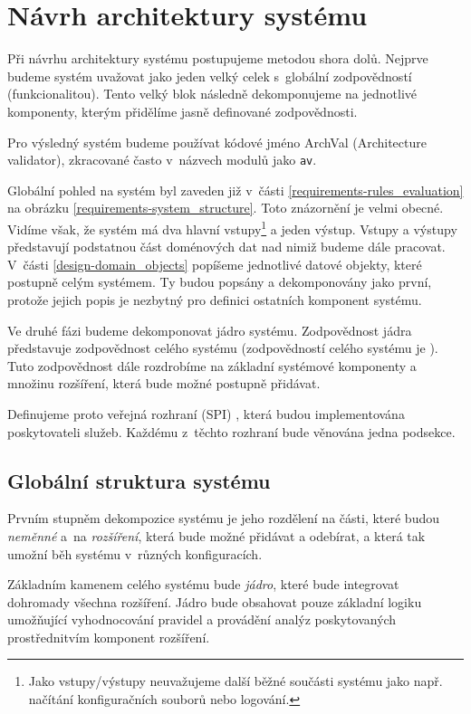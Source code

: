 \section{Návrh architektury systému}
\label{design-architecture}

Při návrhu architektury systému postupujeme metodou shora dolů. Nejprve budeme systém uvažovat jako jeden velký celek s~globální zodpovědností (funkcionalitou). Tento velký blok následně dekomponujeme na jednotlivé komponenty, kterým přidělíme jasně definované zodpovědnosti.

Pro výsledný systém budeme používat kódové jméno ArchVal (Architecture validator), zkracované často v~názvech modulů jako \verb+av+.

Globální pohled na systém byl zaveden již v~části \ref{requirements-rules_evaluation} na obrázku \ref{requirements-system_structure}. Toto znázornění je velmi obecné. Vidíme však, že systém má dva hlavní vstupy\footnote{Jako vstupy/výstupy neuvažujeme další běžné součásti systému jako např. načítání konfiguračních souborů nebo logování.} a jeden výstup. Vstupy a výstupy představují podstatnou část doménových dat nad nimiž budeme dále pracovat. V~části \ref{design-domain_objects} popíšeme jednotlivé datové objekty, které postupně  celým systémem. Ty budou popsány a dekomponovány jako první, protože jejich popis je nezbytný pro definici ostatních komponent systému.

Ve druhé fázi budeme dekomponovat jádro systému. Zodpovědnost jádra představuje zodpovědnost celého systému (zodpovědností celého systému je ). Tuto zodpovědnost dále rozdrobíme na základní systémové komponenty a množinu rozšíření, která bude možné postupně přidávat.

Definujeme proto veřejná rozhraní (SPI) \cite{spi}, která budou implementována poskytovateli služeb. Každému z~těchto rozhraní bude věnována jedna podsekce.

\subsection{Globální struktura systému}
\label{desing-global_system_structure}

Prvním stupněm dekompozice systému je jeho rozdělení na části, které budou \emph{neměnné} a~na \emph{rozšíření}, která bude možné přidávat a odebírat, a která tak umožní běh systému v~různých konfiguracích.

Základním kamenem celého systému bude \emph{jádro}, které bude integrovat dohromady všechna rozšíření. Jádro bude obsahovat pouze základní logiku umožňující vyhodnocování pravidel a provádění analýz poskytovaných prostřednitvím komponent rozšíření.

